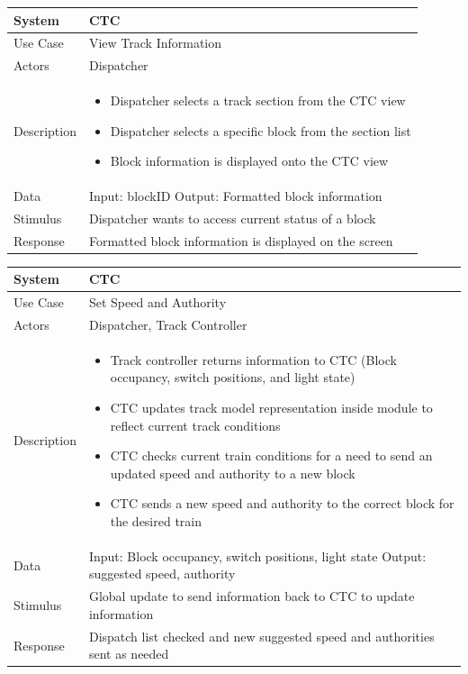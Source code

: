 \documentclass{article}
\begin{document}
    \begin{longtable}{
    || >{\raggedright\arraybackslash}m{}
    | >{\raggedright\arraybackslash}m{}||}
    \hline
    \textbf{System} & \textbf{CTC} \\
    \hline
    Use Case & View Track Information\\
    \hline
    Actors & Dispatcher\\
    \hline
    Description & \begin{itemize}
        \item Dispatcher selects a track section from the CTC view
        \item Dispatcher selects a specific block from the section list
        \item Block information is displayed onto the CTC view
    \end{itemize}\\
    \hline
    Data & Input: blockID \newline Output: Formatted block information\\
    \hline
    Stimulus & Dispatcher wants to access current status of a block\\
    \hline
    Response & Formatted block information is displayed on the screen\\
    \hline
    \end{longtable}
    \begin{longtable}{
    || >{\raggedright\arraybackslash}m{}
    | >{\raggedright\arraybackslash}m{}||}
    \hline
    \textbf{System} & \textbf{CTC} \\
    \hline
    Use Case & Set Speed and Authority\\
    \hline
    Actors & Dispatcher, Track Controller\\
    \hline
    Description & \begin{itemize}
        \item Track controller returns information to CTC (Block occupancy, switch positions, and light state)
        \item CTC updates track model representation inside module to reflect current track conditions
        \item CTC checks current train conditions for a need to send an updated speed and authority to a new block
        \item CTC sends a new speed and authority to the correct block for the desired train
    \end{itemize}\\
    \hline
    Data & Input: Block occupancy, switch positions, light state \newline Output: suggested speed, authority\\
    \hline
    Stimulus & Global update to send information back to CTC to update information\\
    \hline
    Response & Dispatch list checked and new suggested speed and authorities sent as needed\\
    \hline
    \end{longtable}
\end{document}
